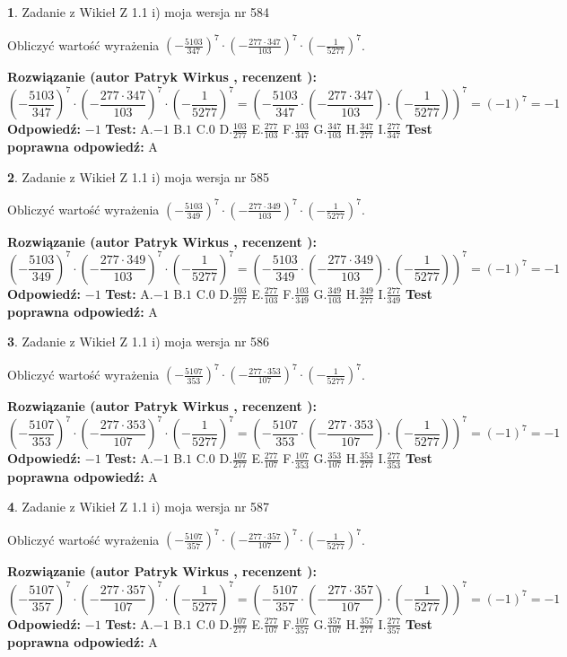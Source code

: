 \documentclass[12pt, a4paper]{article}
\theoremstyle{definition} %
\newtheorem{zad}{}
\newcommand{\zadStart}[1]{\begin{zad}#1\newline}
\newcommand{\zadStop}{\end{zad}}
\newcommand{\rozwStart}[2]{\noindent \textbf{Rozwiązanie (autor #1 , recenzent #2): }\newline}
\newcommand{\rozwStop}{\newline}
\newcommand{\odpStart}{\noindent \textbf{Odpowiedź:}\newline}
\newcommand{\odpStop}{\newline}
\newcommand{\testStart}{\noindent \textbf{Test:}\newline}
\newcommand{\testStop}{\newline}
\newcommand{\kluczStart}{\noindent \textbf{Test poprawna odpowiedź:}\newline}
\newcommand{\kluczStop}{\newline}
\begin{document}
\zadStart{Zadanie z Wikieł Z 1.1 i) moja wersja nr 584}

Obliczyć wartość wyrażenia $(-\frac{5103}{347})^{7} \cdot (-\frac{277 \cdot 347}{103})^{7} \cdot (-\frac{1}{5277})^{7}$.
\zadStop
\rozwStart{Patryk Wirkus}{}
$$(-\frac{5103}{347})^{7} \cdot (-\frac{277 \cdot 347}{103})^{7} \cdot (-\frac{1}{5277})^{7} = (-\frac{5103}{347} \cdot (-\frac{277 \cdot 347}{103}) \cdot (-\frac{1}{5277}))^{7} = (-1)^{7} = -1$$
\rozwStop
\odpStart
$-1$
\odpStop
\testStart
A.$-1$ B.$1$ C.$0$ D.$\frac{103}{277}$ E.$\frac{277}{103}$
F.$\frac{103}{347}$ G.$\frac{347}{103}$
H.$\frac{347}{277}$
I.$\frac{277}{347}$
\testStop
\kluczStart
A
\kluczStop



\zadStart{Zadanie z Wikieł Z 1.1 i) moja wersja nr 585}

Obliczyć wartość wyrażenia $(-\frac{5103}{349})^{7} \cdot (-\frac{277 \cdot 349}{103})^{7} \cdot (-\frac{1}{5277})^{7}$.
\zadStop
\rozwStart{Patryk Wirkus}{}
$$(-\frac{5103}{349})^{7} \cdot (-\frac{277 \cdot 349}{103})^{7} \cdot (-\frac{1}{5277})^{7} = (-\frac{5103}{349} \cdot (-\frac{277 \cdot 349}{103}) \cdot (-\frac{1}{5277}))^{7} = (-1)^{7} = -1$$
\rozwStop
\odpStart
$-1$
\odpStop
\testStart
A.$-1$ B.$1$ C.$0$ D.$\frac{103}{277}$ E.$\frac{277}{103}$
F.$\frac{103}{349}$ G.$\frac{349}{103}$
H.$\frac{349}{277}$
I.$\frac{277}{349}$
\testStop
\kluczStart
A
\kluczStop



\zadStart{Zadanie z Wikieł Z 1.1 i) moja wersja nr 586}

Obliczyć wartość wyrażenia $(-\frac{5107}{353})^{7} \cdot (-\frac{277 \cdot 353}{107})^{7} \cdot (-\frac{1}{5277})^{7}$.
\zadStop
\rozwStart{Patryk Wirkus}{}
$$(-\frac{5107}{353})^{7} \cdot (-\frac{277 \cdot 353}{107})^{7} \cdot (-\frac{1}{5277})^{7} = (-\frac{5107}{353} \cdot (-\frac{277 \cdot 353}{107}) \cdot (-\frac{1}{5277}))^{7} = (-1)^{7} = -1$$
\rozwStop
\odpStart
$-1$
\odpStop
\testStart
A.$-1$ B.$1$ C.$0$ D.$\frac{107}{277}$ E.$\frac{277}{107}$
F.$\frac{107}{353}$ G.$\frac{353}{107}$
H.$\frac{353}{277}$
I.$\frac{277}{353}$
\testStop
\kluczStart
A
\kluczStop



\zadStart{Zadanie z Wikieł Z 1.1 i) moja wersja nr 587}

Obliczyć wartość wyrażenia $(-\frac{5107}{357})^{7} \cdot (-\frac{277 \cdot 357}{107})^{7} \cdot (-\frac{1}{5277})^{7}$.
\zadStop
\rozwStart{Patryk Wirkus}{}
$$(-\frac{5107}{357})^{7} \cdot (-\frac{277 \cdot 357}{107})^{7} \cdot (-\frac{1}{5277})^{7} = (-\frac{5107}{357} \cdot (-\frac{277 \cdot 357}{107}) \cdot (-\frac{1}{5277}))^{7} = (-1)^{7} = -1$$
\rozwStop
\odpStart
$-1$
\odpStop
\testStart
A.$-1$ B.$1$ C.$0$ D.$\frac{107}{277}$ E.$\frac{277}{107}$
F.$\frac{107}{357}$ G.$\frac{357}{107}$
H.$\frac{357}{277}$
I.$\frac{277}{357}$
\testStop
\kluczStart
A
\kluczStop
\end{document}
